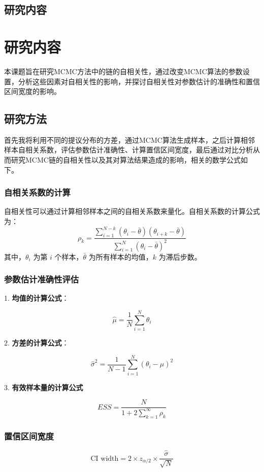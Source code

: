 \documentclass[12pt]{article}
\begin{document}
\subsection{研究内容}

\section{研究内容}

本课题旨在研究MCMC方法中的链的自相关性，通过改变MCMC算法的参数设置，分析这些因素对自相关性的影响，并探讨自相关性对参数估计的准确性和置信区间宽度的影响。
\subsection{研究方法}

首先我将利用不同的提议分布的方差，通过MCMC算法生成样本，之后计算相邻样本自相关系数，评估参数估计准确性、计算置信区间宽度，最后通过对比分析从而研究MCMC链的自相关性以及其对算法结果造成的影响，相关的数学公式如下。

\subsubsection{自相关系数的计算}
自相关性可以通过计算相邻样本之间的自相关系数来量化。自相关系数的计算公式为：
\[
\rho_k = \frac{\sum_{i=1}^{N-k} (\theta_i - \bar{\theta})(\theta_{i+k} - \bar{\theta})}{\sum_{i=1}^{N} (\theta_i - \bar{\theta})^2}
\]
其中，\( \theta_i \) 为第 \( i \) 个样本，\( \bar{\theta} \) 为所有样本的均值，\( k \) 为滞后步数。
\subsubsection{参数估计准确性评估}
	1. \textbf{均值的计算公式}：
	
	\[
	\hat{\mu} = \frac{1}{N} \sum_{i=1}^{N} \theta_i
	\]
	
	2. \textbf{方差的计算公式}：
	
	\[
	\hat{\sigma}^2 = \frac{1}{N-1} \sum_{i=1}^{N} (\theta_i - \hat{\mu})^2
	\]
	
	3. \textbf{有效样本量的计算公式}
	
	\[
	ESS = \frac{N}{1 + 2 \sum_{k=1}^{\infty} \rho_k}
	\]
	
\subsubsection{置信区间宽度}
	\[
\text{CI width} = 2 \times z_{\alpha/2} \times \frac{\hat{\sigma}}{\sqrt{N}}
\]
\end{document}

